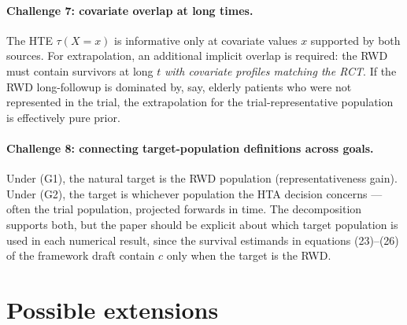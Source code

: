 \documentclass[11pt]{article}
\newcommand{\X}{X}
\newcommand{\tauf}{\tau}
\newcommand{\cf}{c}
\begin{document}
\paragraph{Challenge 7: covariate overlap at long times.}
The HTE $\tauf(\X=x)$ is informative only at covariate values $x$ supported
by both sources. For extrapolation, an additional implicit overlap is
required: the RWD must contain survivors at long $t$ \emph{with covariate
profiles matching the RCT}. If the RWD long-followup is dominated by, say,
elderly patients who were not represented in the trial, the extrapolation
for the trial-representative population is effectively pure prior.

\paragraph{Challenge 8: connecting target-population definitions across goals.}
Under (G1), the natural target is the RWD population (representativeness
gain). Under (G2), the target is whichever population the HTA decision
concerns --- often the trial population, projected forwards in time. The
decomposition supports both, but the paper should be explicit about which
target population is used in each numerical result, since the survival
estimands in equations (23)--(26) of the framework draft contain $\cf$
only when the target is the RWD.

\section{Possible extensions}
\end{document}
